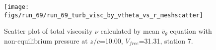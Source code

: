 \begin{figure}[H]
\centering
\texttt{[image: figs/run\_69/run\_69\_turb\_visc\_by\_vtheta\_vs\_r\_meshscatter]}
\caption{Scatter plot of total viscosity $\nu$ calculated by mean $\bar{v}_{\theta}$ equation with non-equilibrium pressure at $z/c$=10.00, $V_{free}$=31.31, station 7.}
\label{fig:run_69_turb_visc_by_vtheta_vs_r_meshscatter}
\end{figure}


